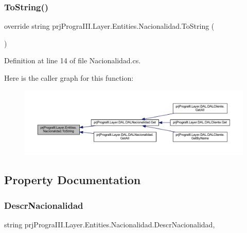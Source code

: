 \subsubsection{\texorpdfstring{To\+String()}{ToString()}}
{\footnotesize\ttfamily override string prj\+Progra\+I\+I\+I.\+Layer.\+Entities.\+Nacionalidad.\+To\+String (\begin{DoxyParamCaption}{ }\end{DoxyParamCaption})}



Definition at line 14 of file Nacionalidad.\+cs.

Here is the caller graph for this function\+:
\nopagebreak
\begin{figure}[H]
\begin{center}
\leavevmode
\includegraphics[width=350pt]{classprj_progra_i_i_i_1_1_layer_1_1_entities_1_1_nacionalidad_a89269e3532443d7b3427a7291068d996_icgraph}
\end{center}
\end{figure}


\subsection{Property Documentation}
\hypertarget{classprj_progra_i_i_i_1_1_layer_1_1_entities_1_1_nacionalidad_a5e94719cea624c494a476e57f2c098d3}{}\label{classprj_progra_i_i_i_1_1_layer_1_1_entities_1_1_nacionalidad_a5e94719cea624c494a476e57f2c098d3} 
\subsubsection{\texorpdfstring{Descr\+Nacionalidad}{DescrNacionalidad}}
{\footnotesize\ttfamily string prj\+Progra\+I\+I\+I.\+Layer.\+Entities.\+Nacionalidad.\+Descr\+Nacionalidad\hspace{0.3cm}{\ttfamily [get]}, {\ttfamily [set]}}



